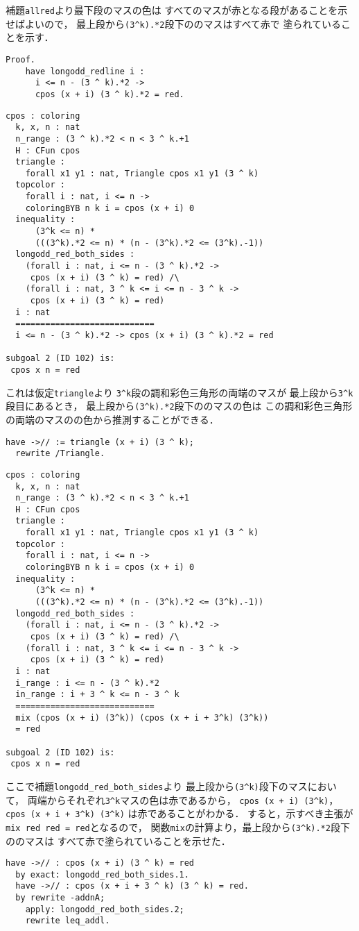 補題{\tt{allred}}より最下段のマスの色は
すべてのマスが赤となる段があることを示せばよいので，
最上段から{\tt{(3\verb|^|k).*2}}段下ののマスはすべて赤で
塗られていることを示す．
\begin{lstlisting}[language=Coq]
  Proof.
    have longodd_redline i :
      i <= n - (3 ^ k).*2 ->
      cpos (x + i) (3 ^ k).*2 = red.
\end{lstlisting}
\begin{lstlisting}[language=Coq]
  cpos : coloring
  k, x, n : nat
  n_range : (3 ^ k).*2 < n < 3 ^ k.+1
  H : CFun cpos
  triangle :
    forall x1 y1 : nat, Triangle cpos x1 y1 (3 ^ k)
  topcolor :
    forall i : nat, i <= n ->
    coloringBYB n k i = cpos (x + i) 0
  inequality :
      (3^k <= n) *
      (((3^k).*2 <= n) * (n - (3^k).*2 <= (3^k).-1))
  longodd_red_both_sides :
    (forall i : nat, i <= n - (3 ^ k).*2 ->
     cpos (x + i) (3 ^ k) = red) /\
    (forall i : nat, 3 ^ k <= i <= n - 3 ^ k ->
     cpos (x + i) (3 ^ k) = red)
  i : nat
  ============================
  i <= n - (3 ^ k).*2 -> cpos (x + i) (3 ^ k).*2 = red

subgoal 2 (ID 102) is:
 cpos x n = red
\end{lstlisting}
これは仮定{\tt{triangle}}より
{\tt{3\verb|^|k}}段の調和彩色三角形の両端のマスが
最上段から{\tt{3\verb|^|k}}段目にあるとき，
最上段から{\tt{(3\verb|^|k).*2}}段下ののマスの色は
この調和彩色三角形の両端のマスのの色から推測することができる．
\begin{lstlisting}[language=Coq]
  have ->// := triangle (x + i) (3 ^ k);
  rewrite /Triangle. 
\end{lstlisting}
\begin{lstlisting}[language=Coq]
  cpos : coloring
  k, x, n : nat
  n_range : (3 ^ k).*2 < n < 3 ^ k.+1
  H : CFun cpos
  triangle :
    forall x1 y1 : nat, Triangle cpos x1 y1 (3 ^ k)
  topcolor :
    forall i : nat, i <= n ->
    coloringBYB n k i = cpos (x + i) 0
  inequality :
      (3^k <= n) *
      (((3^k).*2 <= n) * (n - (3^k).*2 <= (3^k).-1))
  longodd_red_both_sides :
    (forall i : nat, i <= n - (3 ^ k).*2 ->
     cpos (x + i) (3 ^ k) = red) /\
    (forall i : nat, 3 ^ k <= i <= n - 3 ^ k ->
     cpos (x + i) (3 ^ k) = red)
  i : nat
  i_range : i <= n - (3 ^ k).*2
  in_range : i + 3 ^ k <= n - 3 ^ k
  ============================
  mix (cpos (x + i) (3^k)) (cpos (x + i + 3^k) (3^k))
  = red

subgoal 2 (ID 102) is:
 cpos x n = red
\end{lstlisting}
ここで補題{\tt{longodd\_red\_both\_sides}}より
最上段から{\tt{(3\verb|^|k)}}段下のマスにおいて，
両端からそれぞれ{\tt{3\verb|^|k}}マスの色は赤であるから，
{\tt{cpos (x + i) (3\verb|^|k)}}，
{\tt{cpos (x + i + 3\verb|^|k) (3\verb|^|k)}}
は赤であることがわかる．
すると，示すべき主張が{\tt{mix red red = red}}となるので，
関数{\tt{mix}}の計算より，最上段から{\tt{(3\verb|^|k).*2}}段下ののマスは
すべて赤で塗られていることを示せた．
\begin{lstlisting}[language=Coq]
  have ->// : cpos (x + i) (3 ^ k) = red
  by exact: longodd_red_both_sides.1.
  have ->// : cpos (x + i + 3 ^ k) (3 ^ k) = red.
  by rewrite -addnA;
    apply: longodd_red_both_sides.2;
    rewrite leq_addl.
\end{lstlisting}

